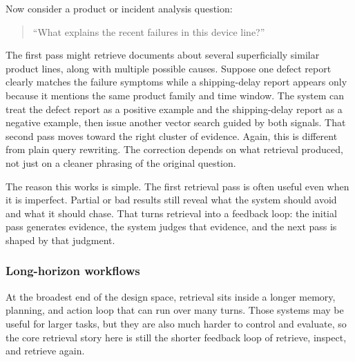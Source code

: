 \documentclass[12pt]{article}
\begin{document}
Now consider a product or incident analysis question:
\begin{quote}
``What explains the recent failures in this device line?''
\end{quote}
The first pass might retrieve documents about several superficially
similar product lines, along with multiple possible causes. Suppose one
defect report clearly matches the failure symptoms while a shipping-delay
report appears only because it mentions the same product family and time
window. The system can treat the defect report as a positive example and
the shipping-delay report as a negative example, then issue another vector
search guided by both signals. That second pass moves toward the right
cluster of evidence. Again, this is different from plain query rewriting.
The correction depends on what retrieval produced, not just on a cleaner
phrasing of the original question.

The reason this works is simple. The first retrieval pass is often useful
even when it is imperfect. Partial or bad results still reveal what the
system should avoid and what it should chase. That turns retrieval into a
feedback loop: the initial pass generates evidence, the system judges that
evidence, and the next pass is shaped by that judgment.

\subsubsection{Long-horizon workflows}

At the broadest end of the design space, retrieval sits inside a longer
memory, planning, and action loop that can run over many turns. Those
systems may be useful for larger tasks, but they are also much harder to
control and evaluate, so the core retrieval story here is still the
shorter feedback loop of retrieve, inspect, and retrieve again.
\end{document}
